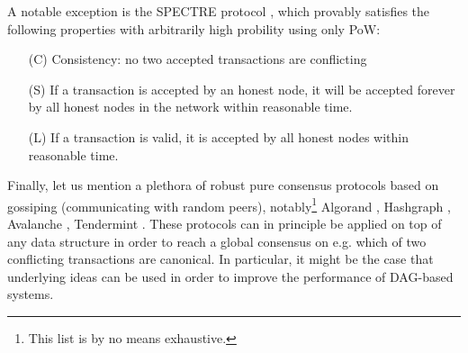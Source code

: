 \documentclass[a4paper]{article}
\begin{document}

A notable exception is the SPECTRE protocol \cite{Spectre}, which provably satisfies the following properties with arbitrarily high probility using only PoW:
\begin{itemize}
  \item[(C)] Consistency: no two accepted transactions are conflicting 
  
  \item[(S)] If a transaction is accepted by an honest node, it will be accepted forever by all honest nodes in the network within reasonable time. 
  
  \item[(L)] If a transaction is valid, it is accepted by all honest nodes within reasonable time.
\end{itemize}

Finally, let us mention a plethora of robust pure consensus protocols based on gossiping (communicating with random peers), notably\footnote{This list is by no means exhaustive.} Algorand \cite{Algorand}, Hashgraph \cite{Hashgraph}, Avalanche \cite{Avalanche}, Tendermint \cite{Tendermint}. These protocols can in principle be applied on top of any data structure in order to reach a global consensus on e.g. which of two conflicting transactions are canonical. In particular, it might be the case that underlying ideas can be used in order to improve the performance of DAG-based systems.





\end{document}
